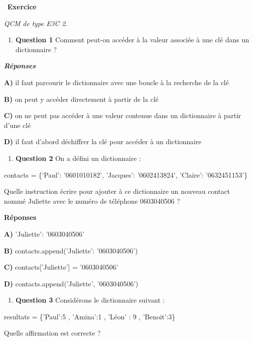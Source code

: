 \documentclass[
  11pt,
]{article}
\providecommand{\tightlist}{%
  \setlength{\itemsep}{0pt}\setlength{\parskip}{0pt}}
\newcounter{exo}
\newenvironment{exercice}[1]
{\par \medskip   \addtocounter{exo}{1} \noindent  
\begin{bclogo}[arrondi =0.1,   noborder = true, logo=\bccrayon, marge=4]{~\textbf{Exercice} \textbf{\theexo} {\itshape #1} }  \par}
{
\end{bclogo}
 \par \bigskip }
\newcounter{def}
\begin{document}
\begin{exercice}{}

\emph{QCM de type E3C 2}.

\begin{enumerate}
\def\labelenumi{\arabic{enumi}.}
\tightlist
\item
  \textbf{Question 1} Comment peut-on accéder à la valeur associée à une
  clé dans un dictionnaire ?
\end{enumerate}

\textbf{\emph{Réponses}}

\textbf{A)} il faut parcourir le dictionnaire avec une boucle à la
recherche de la clé

\textbf{B)} on peut y accéder directement à partir de la clé

\textbf{C)} on ne peut pas accéder à une valeur contenue dans un
dictionnaire à partir d'une clé

\textbf{D)} il faut d'abord déchiffrer la clé pour accéder à un
dictionnaire

\begin{enumerate}
\def\labelenumi{\arabic{enumi}.}
\setcounter{enumi}{1}
\tightlist
\item
  \textbf{Question 2} On a défini un dictionnaire :
\end{enumerate}

contacts = \{'Paul': '0601010182', 'Jacques': '0602413824', 'Claire':
'0632451153'\}

Quelle instruction écrire pour ajouter à ce dictionnaire un nouveau
contact nommé Juliette avec le numéro de téléphone 0603040506 ?

\textbf{Réponses}

\textbf{A)} 'Juliette': '0603040506'

\textbf{B)} contacts.append('Juliette': '0603040506')

\textbf{C)} contacts{[}'Juliette'{]} = '0603040506'

\textbf{D)} contacts.append('Juliette', '0603040506')

\begin{enumerate}
\def\labelenumi{\arabic{enumi}.}
\setcounter{enumi}{2}
\tightlist
\item
  \textbf{Question 3} Considérons le dictionnaire suivant :
\end{enumerate}

resultats = \{'Paul':5 , 'Amina':1 , 'Léon' : 9 , 'Benoit':3\}

Quelle affirmation est correcte ?


\end{exercice}
\end{document}
